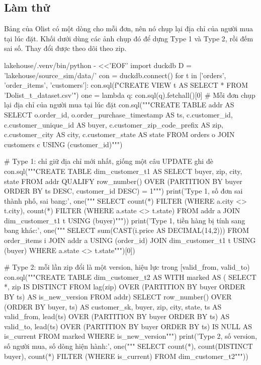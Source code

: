 \subsection{Làm thử}

Bảng  của Olist có một dòng cho mỗi đơn, nên nó chụp lại địa chỉ của người mua tại lúc đặt. Khối dưới dùng các ảnh chụp đó để dựng Type 1 và Type 2, rồi đếm sai số. Thay đổi được theo dõi theo zip.

\begin{codeblock}
lakehouse/.venv/bin/python - <<'EOF'
import duckdb
D = 'lakehouse/source_sim/data/'
con = duckdb.connect()
for t in ['orders', 'order_items', 'customers']:
    con.sql(f"CREATE VIEW {t} AS SELECT * FROM '{D}olist_{t}_dataset.csv'")
one = lambda q: con.sql(q).fetchall()[0]
# Mỗi đơn chụp lại địa chỉ của người mua tại lúc đặt
con.sql("""CREATE TABLE addr AS
  SELECT o.order_id, o.order_purchase_timestamp AS ts, c.customer_id,
         c.customer_unique_id AS buyer, c.customer_zip_code_prefix AS zip,
         c.customer_city AS city, c.customer_state AS state
  FROM orders o JOIN customers c USING (customer_id)""")

# Type 1: chỉ giữ địa chỉ mới nhất, giống một câu UPDATE ghi đè
con.sql("""CREATE TABLE dim_customer_t1 AS
  SELECT buyer, zip, city, state FROM addr
  QUALIFY row_number() OVER (PARTITION BY buyer
                             ORDER BY ts DESC, customer_id DESC) = 1""")
print('Type 1, số đơn sai thành phố, sai bang:', one("""
  SELECT count(*) FILTER (WHERE a.city <> t.city),
         count(*) FILTER (WHERE a.state <> t.state)
  FROM addr a JOIN dim_customer_t1 t USING (buyer)"""))
print('Type 1, tiền hàng bị tính sang bang khác:', one("""
  SELECT sum(CAST(i.price AS DECIMAL(14,2)))
  FROM order_items i JOIN addr a USING (order_id)
  JOIN dim_customer_t1 t USING (buyer)
  WHERE a.state <> t.state""")[0])

# Type 2: mỗi lần zip đổi là một version, hiệu lực trong [valid_from, valid_to)
con.sql("""CREATE TABLE dim_customer_t2 AS
  WITH marked AS (
    SELECT *, zip IS DISTINCT FROM lag(zip) OVER (PARTITION BY buyer ORDER BY ts)
                AS is_new_version
    FROM addr)
  SELECT row_number() OVER (ORDER BY buyer, ts) AS customer_sk,
         buyer, zip, city, state,
         ts AS valid_from,
         lead(ts) OVER (PARTITION BY buyer ORDER BY ts) AS valid_to,
         lead(ts) OVER (PARTITION BY buyer ORDER BY ts) IS NULL AS is_current
  FROM marked WHERE is_new_version""")
print('Type 2, số version, số người mua, số dòng hiện hành:', one("""
  SELECT count(*), count(DISTINCT buyer), count(*) FILTER (WHERE is_current)
  FROM dim_customer_t2"""))


\end{codeblock}

